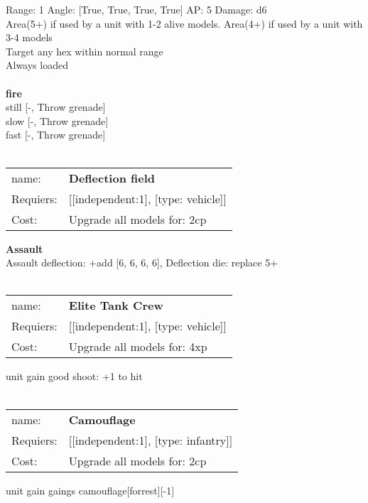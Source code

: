 Range: 1  Angle: [True, True, True, True] AP: 5 Damage: d6 \\
Area(5+) if used by a unit with 1-2 alive models. Area(4+) if used by a unit with 3-4 models\\ 
Target any hex within normal range\\ 
Always loaded\\ 







\ \\ {\bf fire } \\
still [-, Throw grenade] \\
slow [-, Throw grenade] \\
fast [-, Throw grenade] \\

\ \\
\begin{tabular}{ll}
name: & {\bf Deflection field } \\
Requiers: & [[independent:1], [type: vehicle]] \\
Cost: & Upgrade all models for: 2cp \\
\end{tabular}





{\bf Assault} \ \\
Assault deflection: +add [6, 6, 6, 6], Deflection die: replace 5+
\\ 




\ \\
\begin{tabular}{ll}
name: & {\bf Elite Tank Crew } \\
Requiers: & [[independent:1], [type: vehicle]] \\
Cost: & Upgrade all models for: 4xp \\
\end{tabular}

unit gain good shoot: +1 to hit\\ 









\ \\
\begin{tabular}{ll}
name: & {\bf Camouflage } \\
Requiers: & [[independent:1], [type: infantry]] \\
Cost: & Upgrade all models for: 2cp \\
\end{tabular}

unit gain gaings camouflage[forrest][-1]\\ 









